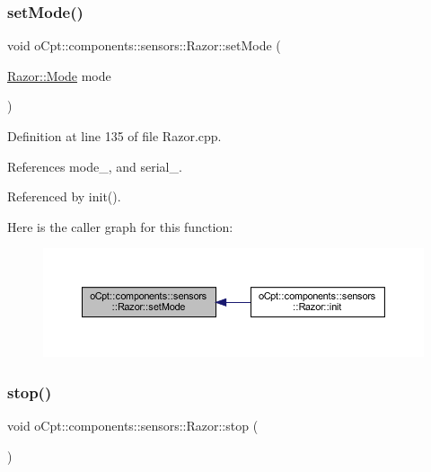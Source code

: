 \subsubsection{\texorpdfstring{set\+Mode()}{setMode()}}
{\footnotesize\ttfamily void o\+Cpt\+::components\+::sensors\+::\+Razor\+::set\+Mode (\begin{DoxyParamCaption}\item[{\hyperlink{classo_cpt_1_1components_1_1sensors_1_1_razor_afed258e485aaaf9193a57d649ccb159b}{Razor\+::\+Mode}}]{mode }\end{DoxyParamCaption})}



Definition at line 135 of file Razor.\+cpp.



References mode\+\_\+, and serial\+\_\+.



Referenced by init().

Here is the caller graph for this function\+:
\nopagebreak
\begin{figure}[H]
\begin{center}
\leavevmode
\includegraphics[width=350pt]{classo_cpt_1_1components_1_1sensors_1_1_razor_a25a3159510e0b725eaf817b8775420ac_icgraph}
\end{center}
\end{figure}
\hypertarget{classo_cpt_1_1components_1_1sensors_1_1_razor_a807441c137892ee3c1b612c284893fa1}{}\label{classo_cpt_1_1components_1_1sensors_1_1_razor_a807441c137892ee3c1b612c284893fa1} 
\subsubsection{\texorpdfstring{stop()}{stop()}}
{\footnotesize\ttfamily void o\+Cpt\+::components\+::sensors\+::\+Razor\+::stop (\begin{DoxyParamCaption}{ }\end{DoxyParamCaption})\hspace{0.3cm}{\ttfamily [virtual]}}

